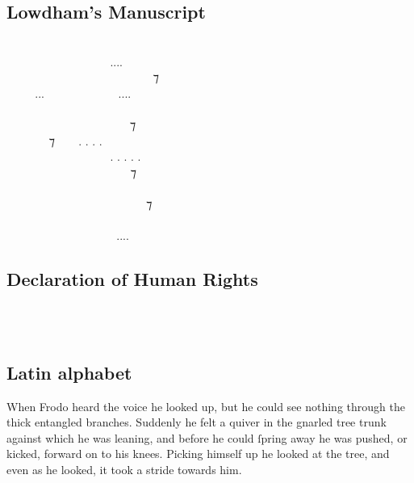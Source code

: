\documentclass[11pt,a4paper]{article}
\begin{document}
\subsection*{Lowdham’s Manuscript}
\tengtelc
     ‍  ‍  \\
    ‍....  ‍  \\
  ‍   ‍ ‍ ⁊   \\
...  ....   \\
          \\
  ‍   ⁊  ‍ ‍ \\
 ‍ ⁊  . . . .   ‍   \\
   ‍ . . . . .     \\
      ⁊    \\
   ‍   ‍  \\
      ⁊   \\
        \\
  ‍  .... ‍    \\

\subsection*{Declaration of Human Rights}
\tengtelcb
\begin{center}
                              
\end{center}

\subsection*{Latin alphabet}
\tengtelcb
When Frodo heard the voice he looked up, but he could
see nothing through the thick entangled branches.
Suddenly he felt a quiver in the gnarled tree trunk
against which he was leaning, and before he could
ſpring away he was pushed, or kicked, forward on to
his knees. Picking himself up he looked at the tree,
and even as he looked, it took a stride towards him.
\end{document}
